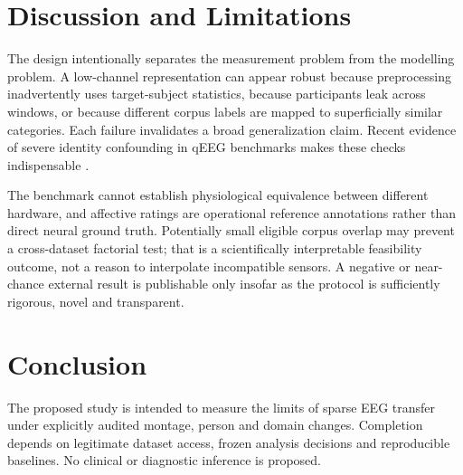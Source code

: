 \section{Discussion and Limitations}
The design intentionally separates the measurement problem from the modelling problem. A low-channel representation can appear robust because preprocessing inadvertently uses target-subject statistics, because participants leak across windows, or because different corpus labels are mapped to superficially similar categories. Each failure invalidates a broad generalization claim. Recent evidence of severe identity confounding in qEEG benchmarks makes these checks indispensable \cite{pandilova2026}.

The benchmark cannot establish physiological equivalence between different hardware, and affective ratings are operational reference annotations rather than direct neural ground truth. Potentially small eligible corpus overlap may prevent a cross-dataset factorial test; that is a scientifically interpretable feasibility outcome, not a reason to interpolate incompatible sensors. A negative or near-chance external result is publishable only insofar as the protocol is sufficiently rigorous, novel and transparent.

\section{Conclusion}
The proposed study is intended to measure the limits of sparse EEG transfer under explicitly audited montage, person and domain changes. Completion depends on legitimate dataset access, frozen analysis decisions and reproducible baselines. No clinical or diagnostic inference is proposed.
